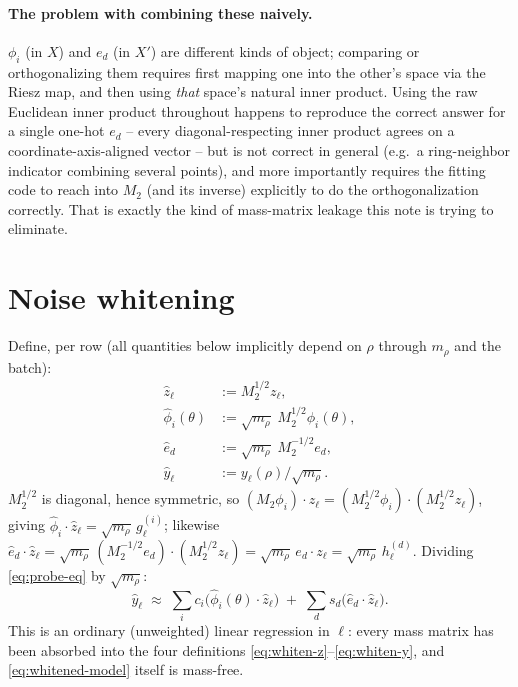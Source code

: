 \documentclass[11pt]{article}
\newcommand{\Mtwo}{M_2}
\newcommand{\what}[1]{\widehat{#1}}
\begin{document}
\paragraph{The problem with combining these naively.} $\phi_i$ (in $X$) and
$e_d$ (in $X'$) are different kinds of object; comparing or orthogonalizing
them requires first mapping one into the other's space via the Riesz map,
and then using \emph{that} space's natural inner product. Using the raw
Euclidean inner product throughout happens to reproduce the correct answer
for a single one-hot $e_d$ -- every
diagonal-respecting inner product agrees on a coordinate-axis-aligned vector
-- but is not correct in general (e.g.\ a ring-neighbor indicator combining
several points), and more importantly requires the fitting code to reach
into $\Mtwo$ (and its inverse) explicitly to do the orthogonalization
correctly. That is exactly the kind of mass-matrix leakage this note is
trying to eliminate.

\section{Noise whitening}

Define, per row (all quantities below implicitly depend on $\rho$ through
$m_\rho$ and the batch):
\begin{align}
\what{z}_\ell &:= \Mtwo^{1/2} z_\ell, \label{eq:whiten-z}\\
\what{\phi}_i(\theta) &:= \sqrt{m_\rho}\; \Mtwo^{1/2} \phi_i(\theta), \label{eq:whiten-phi}\\
\what{e}_d &:= \sqrt{m_\rho}\; \Mtwo^{-1/2} e_d, \label{eq:whiten-e}\\
\what{y}_\ell &:= y_\ell(\rho) / \sqrt{m_\rho}. \label{eq:whiten-y}
\end{align}
$\Mtwo^{1/2}$ is diagonal, hence symmetric, so $(\Mtwo \phi_i)\cdot z_\ell =
(\Mtwo^{1/2}\phi_i)\cdot(\Mtwo^{1/2}z_\ell)$, giving $\what\phi_i \cdot
\what z_\ell = \sqrt{m_\rho}\, g_\ell^{(i)}$; likewise $\what e_d \cdot \what
z_\ell = \sqrt{m_\rho}\,(\Mtwo^{-1/2}e_d)\cdot(\Mtwo^{1/2}z_\ell) =
\sqrt{m_\rho}\, e_d\cdot z_\ell = \sqrt{m_\rho}\, h_\ell^{(d)}$. Dividing
\eqref{eq:probe-eq} by $\sqrt{m_\rho}$:
\begin{equation}
\what y_\ell \;\approx\; \sum_i c_i \big(\what\phi_i(\theta)\cdot\what z_\ell\big)
\;+\; \sum_d s_d \big(\what e_d \cdot \what z_\ell\big).
\label{eq:whitened-model}
\end{equation}
This is an ordinary (unweighted) linear regression in $\ell$: every mass
matrix has been absorbed into the four definitions
\eqref{eq:whiten-z}--\eqref{eq:whiten-y}, and \eqref{eq:whitened-model}
itself is mass-free.
\end{document}
